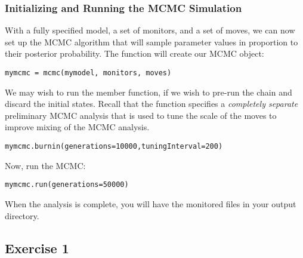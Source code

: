 \subsubsection{Initializing and Running the MCMC Simulation}

With a fully specified model, a set of monitors, and a set of moves, we can now set up the MCMC algorithm that will sample parameter values in proportion to their posterior probability. The  function will create our MCMC object:
{\tt \begin{snugshade*}
\begin{lstlisting}
mymcmc = mcmc(mymodel, monitors, moves)
\end{lstlisting}
\end{snugshade*}}


We may wish to run the  member function, \IE if we wish to pre-run the chain and discard the initial states.
Recall that the  function specifies a \textit{completely separate} preliminary MCMC analysis that is used to tune the scale of the moves to improve mixing of the MCMC analysis.
{\tt \begin{snugshade*}
\begin{lstlisting}
mymcmc.burnin(generations=10000,tuningInterval=200)
\end{lstlisting}
\end{snugshade*}}


Now, run the MCMC:
{\tt \begin{snugshade*}
\begin{lstlisting}
mymcmc.run(generations=50000)
\end{lstlisting}
\end{snugshade*}}

When the analysis is complete, you will have the monitored files in your output directory.



\subsection{Exercise 1}

